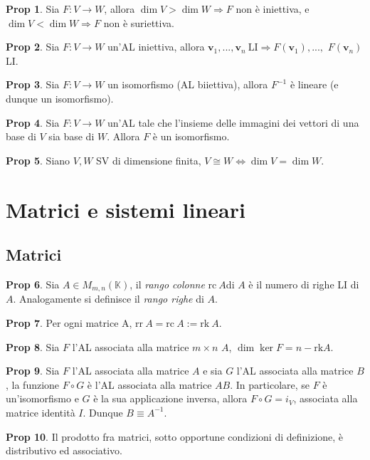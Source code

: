 \documentclass[]{article}
\newcommand{\vv}{\mathbf{v}}
\theoremstyle{definition}
\theoremstyle{definition}
\newtheorem{prop}{Prop}[subsection]
\theoremstyle{definition}
\begin{document}
\begin{prop} Sia $F: V \to W$, allora $\dim V > \dim W \Rightarrow F$ non è iniettiva, e $\dim V < \dim W \Rightarrow F$ non è suriettiva.

\end{prop} \begin{prop} Sia $F: V \to W$ un'AL iniettiva, allora $\vv _1 ,..., \vv _n \ \mathrm{LI} \Rightarrow F( \vv _1 ) ,...,$ $F( \vv _n)$ LI.

\end{prop} \begin{prop} Sia $F: V \to W$ un isomorfismo (AL biiettiva), allora $F^{-1}$ è lineare (e dunque un isomorfismo).

\end{prop} \begin{prop} Sia $F:V \to W$ un'AL tale che l'insieme delle immagini dei vettori di una base di $V$ sia base di $W$. Allora $F$ è un isomorfismo.

\end{prop} \begin{prop} Siano $V, W$ SV di dimensione finita, $V \cong W \Leftrightarrow \dim V = \dim W$.
\end{prop}

\section{Matrici e sistemi lineari}
\subsection{Matrici}

\begin{prop} Sia $A \in M_{m,n}(\mathbb{K})$, il \emph{rango colonne} $\mathrm{rc}\ A$di $A$ è il numero di righe LI di $A$. Analogamente si definisce il \emph{rango righe} di $A$.

\end{prop} \begin{prop} Per ogni matrice A, $\mathrm{rr}\ A= \mathrm{rc}\ A := \mathrm{rk}\ A$.

\end{prop} \begin{prop} Sia $F$ l'AL associata alla matrice $m \times n$ $A$, $\dim \ker F = n - \mathrm{rk} A$.

\end{prop} \begin{prop} Sia $F$ l'AL associata alla matrice $A$ e sia $G$ l'AL associata alla matrice $B$, la funzione $F \circ G$ è l'AL associata alla matrice $AB$. In particolare, se $F$ è un'isomorfismo e $G$ è la sua applicazione inversa, allora $F \circ G = i_{V}$, associata alla matrice identità $I$. Dunque $B \equiv A^{-1}$.

\end{prop} \begin{prop} Il prodotto fra matrici, sotto opportune condizioni di definizione, è distributivo ed associativo. 
\end{prop}
\end{document}
